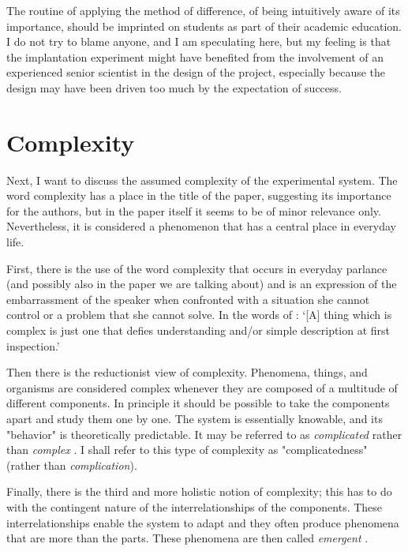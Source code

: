 \documentclass[twocolumn, reflection, authordate, serif, seplic]{jote-article}
\begin{document}
The routine of applying the method of difference, of being intuitively aware of its importance, should be imprinted on students as part of their academic education. I do not try to blame anyone, and I am speculating here, but my feeling is that the implantation experiment might have benefited from the involvement of an experienced senior scientist in the design of the project, especially because the design may have been driven too much by the expectation of success.

 {}\section*{Complexity} 

Next, I want to discuss the assumed complexity of the experimental system. The word complexity has a place in the title of the paper, suggesting its importance for the authors, but in the paper itself it seems to be of minor relevance only. Nevertheless, it is considered a phenomenon that has a central place in everyday life.

First, there is the use of the word complexity that occurs in everyday parlance (and possibly also in the paper we are talking about) and is an expression of the embarrassment of the speaker when confronted with a situation she cannot control or a problem that she cannot solve. In the words of \textcite[p. 748]{Chambers2015}: `{[}A{]} thing which is complex is just one that defies understanding and/or simple description at first inspection.'

Then there is the reductionist view of complexity. Phenomena, things, and organisms are considered complex whenever they are composed of a multitude of different components. In principle it should be possible to take the components apart and study them one by one. The system is essentially knowable, and its "behavior" is theoretically predictable. It may be referred to as \emph{complicated} rather than \emph{complex}
\parencite{Bawden2007}. I shall refer to this type of complexity as "complicatedness" (rather than \emph{complication}).

Finally, there is the third and more holistic notion of complexity; this has to do with the contingent nature of the interrelationships of the components. These interrelationships enable the system to adapt and they often produce phenomena that are more than the parts. These phenomena are then called \emph{emergent} \parencite{Page2011}.
\end{document}
